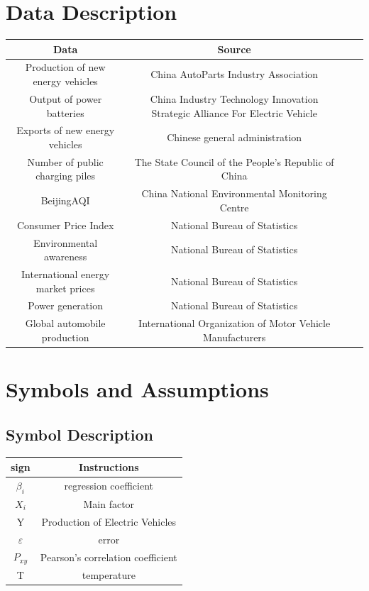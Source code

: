 \documentclass{apmcmthesis}
\begin{document}
\section{Data Description} 

\begin{longtable}{c c c c}
Data & Source  \\ \hline 
Production of new energy vehicles  & China AutoParts Industry Association   \\
Output of power batteries &  China Industry Technology Innovation Strategic Alliance For Electric Vehicle \\
Exports of new energy vehicles & Chinese general administration \\
Number of public charging piles & The State Council of the People's Republic of China \\
BeijingAQI & China National Environmental Monitoring Centre \\
Consumer Price Index & National Bureau of Statistics \\
Environmental awareness & National Bureau of Statistics \\
International energy market prices & National Bureau of Statistics \\
Power generation & National Bureau of Statistics \\ 
Global automobile production & International Organization of Motor Vehicle Manufacturers \\ \hline
\end{longtable}


\section{Symbols and Assumptions}
\subsection{Symbol Description}
\begin{table}[h]
    \centering
    \begin{tabular}{cc}
    \hline
    sign        & Instructions                      \\ \hline
    $\beta_i$   & regression coefficient            \\
    $X_i$       & Main factor      \\
    Y           & Production of Electric Vehicles    \\
    $\varepsilon$ & error                             \\
    $P_{xy}$     & Pearson's correlation coefficient \\
    T           & temperature                       \\ \hline
    \end{tabular}
    \end{table}
\end{document}
